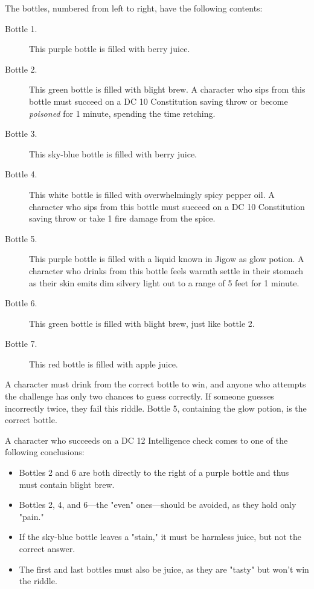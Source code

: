 \documentclass[a4paper, 11pt, bg=full, twocolumn, nooutline]{dndbook}
\begin{document}
The bottles, numbered from left to right, have the following contents:

\begin{description}
\item[Bottle 1.] This purple bottle is filled with berry juice.
\item[Bottle 2.] This green bottle is filled with blight brew. A character who sips from this bottle must succeed on a DC 10 Constitution saving throw or become \textit{poisoned} for 1 minute, spending the time retching.
\item[Bottle 3.] This sky-blue bottle is filled with berry juice.
\item[Bottle 4.] This white bottle is filled with overwhelmingly spicy pepper oil. A character who sips from this bottle must succeed on a DC 10 Constitution saving throw or take 1 fire damage from the spice.
\item[Bottle 5.] This purple bottle is filled with a liquid known in Jigow as glow potion. A character who drinks from this bottle feels warmth settle in their stomach as their skin emits dim silvery light out to a range of 5 feet for 1 minute.
\item[Bottle 6.] This green bottle is filled with blight brew, just like bottle 2.
\item[Bottle 7.] This red bottle is filled with apple juice.
\end{description}

A character must drink from the correct bottle to win, and anyone who attempts the challenge has only two chances to guess correctly. If someone guesses incorrectly twice, they fail this riddle. Bottle 5, containing the glow potion, is the correct bottle.

A character who succeeds on a DC 12 Intelligence check comes to one of the following conclusions:

\begin{itemize}
\item Bottles 2 and 6 are both directly to the right of a purple bottle and thus must contain blight brew.
\item Bottles 2, 4, and 6---the "even" ones---should be avoided, as they hold only "pain."
\item If the sky-blue bottle leaves a "stain," it must be harmless juice, but not the correct answer.
\item The first and last bottles must also be juice, as they are "tasty" but won't win the riddle.
\end{itemize}
\end{document}
